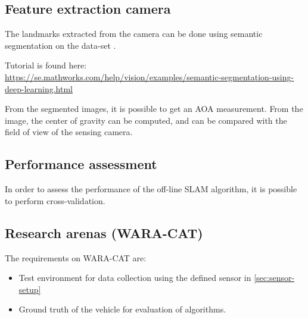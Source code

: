 \subsection{Feature extraction camera}

The landmarks extracted from the camera can be done using semantic
segmentation on the data-set \cite{Brostow:2009:SOC:1464534.1465403}.

Tutorial is found here:
\url{https://se.mathworks.com/help/vision/examples/semantic-segmentation-using-deep-learning.html}

From the segmented images, it is possible to get an \gls{AOA}
measurement. From the image, the center of gravity can be computed,
and can be compared with the field of view of the sensing camera.



\subsection{Performance assessment}

In order to assess the performance of the off-line \gls{SLAM}
algorithm, it is possible to perform cross-validation.

\subsection{Research arenas (WARA-CAT)}


The requirements on WARA-CAT are:
\begin{itemize}
  \item Test environment for data collection using the defined sensor in
    \ref{sec:sensor-setup}
\item Ground truth of the vehicle for evaluation of algorithms.
\end{itemize}


